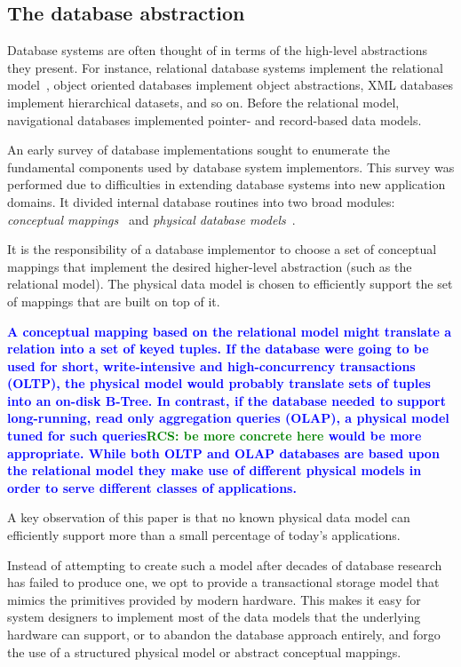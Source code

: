 \documentclass[letterpaper,twocolumn,10pt]{article}
\newcommand{\diff}[1]{\textcolor{blue}{\bf #1}}
\newcommand{\rcs}[1]{\textcolor{green}{\bf RCS: #1}}
\begin{document}
\subsection{The database abstraction}

Database systems are often thought of in terms of the high-level
abstractions they present.  For instance, relational database systems
implement the relational model~\cite{codd}, object oriented
databases implement object abstractions, XML databases implement
hierarchical datasets, and so on.  Before the relational model,
navigational databases implemented pointer- and record-based data models.

An early survey of database implementations sought to enumerate the
fundamental components used by database system implementors.  This
survey was performed due to difficulties in extending database systems
into new application domains.  It divided internal database
routines into two broad modules: {\em conceptual
mappings}~\cite{batoryConceptual} and {\em physical
database models}~\cite{batoryPhysical}.


It is the responsibility of a database implementor to choose a set of
conceptual mappings that implement the desired higher-level
abstraction (such as the relational model).  The physical data model
is chosen to efficiently support the set of mappings that are built on
top of it.

\diff{A conceptual mapping based on the relational model might
translate a relation into a set of keyed tuples.  If the database were
going to be used for short, write-intensive and high-concurrency
transactions (OLTP), the physical model would probably translate sets
of tuples into an on-disk B-Tree.  In contrast, if the database needed
to support long-running, read only aggregation queries (OLAP), a
physical model tuned for such queries\rcs{be more concrete here} would
be more appropriate.  While both OLTP and OLAP databases are based
upon the relational model they make use of different physical models
in order to serve different classes of applications.}

A key observation of this paper is that no known physical data model
can efficiently support more than a small percentage of today's applications.  

Instead of attempting to create such a model after decades of database
research has failed to produce one, we opt to provide a transactional
storage model that mimics the primitives provided by modern hardware.
This makes it easy for system designers to implement most of the data
models that the underlying hardware can support, or to
abandon the database approach entirely, and forgo the use of a
structured physical model or abstract conceptual mappings.
\end{document}
